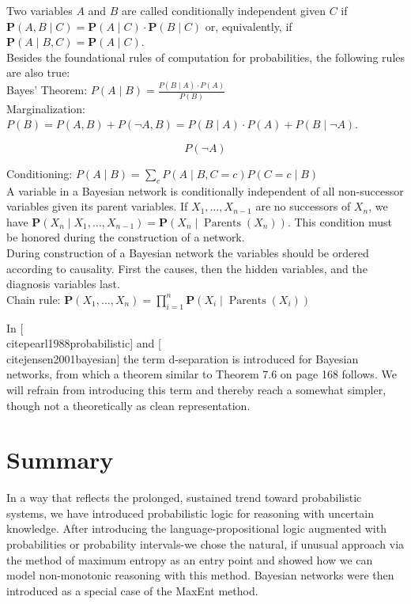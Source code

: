 \documentclass[10pt]{book}
\begin{document}
Two variables $A$ and $B$ are called conditionally independent given $C$ if $\boldsymbol{P}(A, B \mid C)=\boldsymbol{P}(A \mid C) \cdot \boldsymbol{P}(B \mid C)$ or, equivalently, if $\boldsymbol{P}(A \mid B, C)=\boldsymbol{P}(A \mid C)$.\\
Besides the foundational rules of computation for probabilities, the following rules are also true:\\
Bayes' Theorem: $P(A \mid B)=\frac{P(B \mid A) \cdot P(A)}{P(B)}$\\
Marginalization: $P(B)=P(A, B)+P(\neg A, B)=P(B \mid A) \cdot P(A)+P(B \mid \neg A)$.

$$
P(\neg A)
$$

Conditioning: $P(A \mid B)=\sum_{c} P(A \mid B, C=c) P(C=c \mid B)$\\
A variable in a Bayesian network is conditionally independent of all non-successor variables given its parent variables. If $X_{1}, \ldots, X_{n-1}$ are no successors of $X_{n}$, we have $\boldsymbol{P}\left(X_{n} \mid X_{1}, \ldots, X_{n-1}\right)=\boldsymbol{P}\left(X_{n} \mid \operatorname{Parents}\left(X_{n}\right)\right)$. This condition must be honored during the construction of a network.\\
During construction of a Bayesian network the variables should be ordered according to causality. First the causes, then the hidden variables, and the diagnosis variables last.\\
Chain rule: $\boldsymbol{P}\left(X_{1}, \ldots, X_{n}\right)=\prod_{i=1}^{n} \boldsymbol{P}\left(X_{i} \mid \operatorname{Parents}\left(X_{i}\right)\right)$

In [\\cite{pearl1988probabilistic}] and [\\cite{jensen2001bayesian}] the term d-separation is introduced for Bayesian networks, from which a theorem similar to Theorem 7.6 on page 168 follows. We will refrain from introducing this term and thereby reach a somewhat simpler, though not a theoretically as clean representation.

\section{Summary}
In a way that reflects the prolonged, sustained trend toward probabilistic systems, we have introduced probabilistic logic for reasoning with uncertain knowledge. After introducing the language-propositional logic augmented with probabilities or probability intervals-we chose the natural, if unusual approach via the method of maximum entropy as an entry point and showed how we can model non-monotonic reasoning with this method. Bayesian networks were then introduced as a special case of the MaxEnt method.
\end{document}
